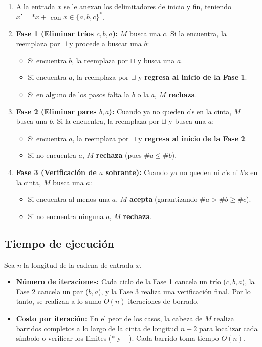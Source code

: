 \begin{enumerate}
    \item A la entrada $x$ se le anexan los delimitadores de inicio y fin, teniendo $x' = *x+$ con $x \in \{a,b,c\}^*$.
    
    \item \textbf{Fase 1 (Eliminar tríos $c, b, a$):}
    $M$ busca una $c$. Si la encuentra, la reemplaza por $\sqcup$ y procede a buscar una $b$:
    \begin{itemize}
        \item Si encuentra $b$, la reemplaza por $\sqcup$ y busca una $a$.
        \item Si encuentra $a$, la reemplaza por $\sqcup$ y \textbf{regresa al inicio de la Fase 1}.
        \item Si en alguno de los pasos falta la $b$ o la $a$, $M$ \textbf{rechaza}.
    \end{itemize}
    
    \item \textbf{Fase 2 (Eliminar pares $b, a$):}
    Cuando ya no queden $c$'s en la cinta, $M$ busca una $b$. Si la encuentra, la reemplaza por $\sqcup$ y busca una $a$:
    \begin{itemize}
        \item Si encuentra $a$, la reemplaza por $\sqcup$ y \textbf{regresa al inicio de la Fase 2}.
        \item Si no encuentra $a$, $M$ \textbf{rechaza} (pues $\#a \le \#b$).
    \end{itemize}
    
    \item \textbf{Fase 3 (Verificación de $a$ sobrante):}
    Cuando ya no queden ni $c$'s ni $b$'s en la cinta, $M$ busca una $a$:
    \begin{itemize}
        \item Si encuentra al menos una $a$, $M$ \textbf{acepta} (garantizando $\#a > \#b \ge \#c$).
        \item Si no encuentra ninguna $a$, $M$ \textbf{rechaza}.
    \end{itemize}
\end{enumerate}

\subsection{Tiempo de ejecución}

Sea $n$ la longitud de la cadena de entrada $x$.

\begin{itemize}
    \item \textbf{Número de iteraciones:} Cada ciclo de la Fase 1 cancela un trío ($c,b,a$), la Fase 2 cancela un par ($b,a$), y la Fase 3 realiza una verificación final. Por lo tanto, se realizan a lo sumo $O(n)$ iteraciones de borrado.
    \item \textbf{Costo por iteración:} En el peor de los casos, la cabeza de $M$ realiza barridos completos a lo largo de la cinta de longitud $n+2$ para localizar cada símbolo o verificar los límites ($*$ y $+$). Cada barrido toma tiempo $O(n)$.
\end{itemize}

